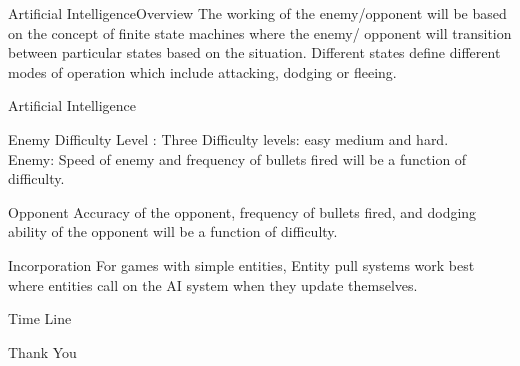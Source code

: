 \documentclass{beamer}
\begin{document}
\begin{frame}{Artificial Intelligence}{Overview}
  The working of the enemy/opponent will be based on the concept of finite state machines where the enemy/ opponent will transition between particular states based on the situation. Different states define different modes of operation which include attacking, dodging or fleeing.
\end{frame}

\begin{frame}{Artificial Intelligence}{}
	\begin{block}{Enemy}
  			Difficulty Level : Three Difficulty levels: easy medium and hard. \\
			Enemy: Speed of enemy and frequency of bullets fired will be a function of difficulty.
 	\end{block}
	\begin{block}{Opponent} 
  			Accuracy of the opponent, frequency of bullets fired, and dodging ability of the opponent will be a function of difficulty.
	\end{block}
	\begin{block}{Incorporation}
		For games with simple entities, Entity pull systems work best where entities call on the AI system when they update themselves.
	\end{block}
\end{frame}

\begin{frame}{Time Line}{}
	  
\end{frame}

\begin{frame}
	\vfill
	\begin{center}
		\huge{Thank You}
	\end{center}
	\vfill
\end{frame}
\end{document}
